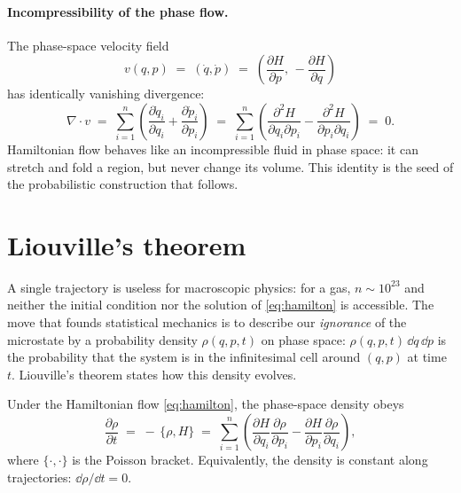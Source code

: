 \paragraph{Incompressibility of the phase flow.} The phase-space velocity
field
\begin{equation}
  v(q, p) \;=\; (\dot q, \dot p)
  \;=\; \left( \frac{\partial H}{\partial p},\, -\frac{\partial H}{\partial q} \right)
  \label{eq:phase-velocity}
\end{equation}
has identically vanishing divergence:
\begin{equation}
  \nabla \cdot v
  \;=\; \sum_{i=1}^n \left(
      \frac{\partial \dot q_i}{\partial q_i}
      + \frac{\partial \dot p_i}{\partial p_i}
    \right)
  \;=\; \sum_{i=1}^n \left(
      \frac{\partial^2 H}{\partial q_i \partial p_i}
      - \frac{\partial^2 H}{\partial p_i \partial q_i}
    \right)
  \;=\; 0 .
  \label{eq:incompressible}
\end{equation}
Hamiltonian flow behaves like an incompressible fluid in phase space: it
can stretch and fold a region, but never change its volume. This identity
is the seed of the probabilistic construction that follows.

\section{Liouville's theorem}\label{sec:liouville}

A single trajectory is useless for macroscopic physics: for a gas,
$n \sim 10^{23}$ and neither the initial condition nor the solution of
\eqref{eq:hamilton} is accessible. The move that founds statistical
mechanics is to describe our \emph{ignorance} of the microstate by a
probability density $\rho(q, p, t)$ on phase space:
$\rho(q,p,t)\,\dd q\,\dd p$ is the probability that the system is in the
infinitesimal cell around $(q,p)$ at time $t$. Liouville's theorem states
how this density evolves.

\begin{theorem}[Liouville]\label{thm:liouville}
Under the Hamiltonian flow \eqref{eq:hamilton}, the phase-space density
obeys
\begin{equation}
  \frac{\partial \rho}{\partial t}
  \;=\; -\,\{\rho, H\}
  \;=\; \sum_{i=1}^n \left(
    \frac{\partial H}{\partial q_i}\frac{\partial \rho}{\partial p_i}
    - \frac{\partial H}{\partial p_i}\frac{\partial \rho}{\partial q_i}
  \right),
  \label{eq:liouville}
\end{equation}
where $\{\cdot,\cdot\}$ is the Poisson bracket. Equivalently, the density
is constant along trajectories: $\dd \rho / \dd t = 0$.
\end{theorem}

